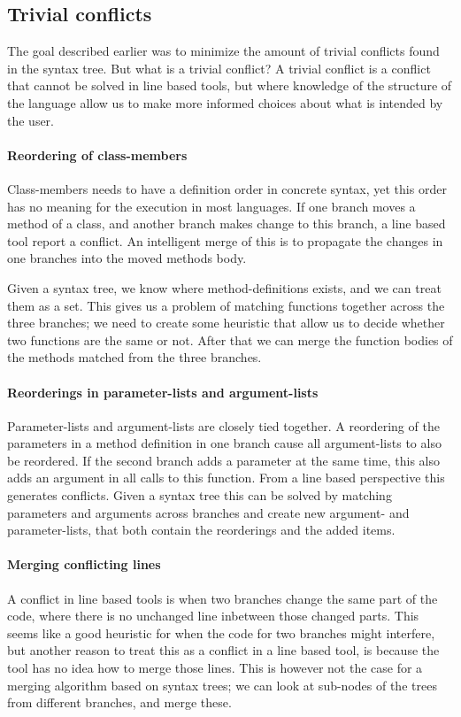 \documentclass[11pt]{article}
\begin{document}
\subsection{Trivial conflicts}
\label{TrivialConflict}
The goal described earlier was to minimize the amount of trivial conflicts found in the syntax tree. But what is a trivial conflict? A trivial conflict is a conflict that cannot be solved in line based tools, but where knowledge of the structure of the language allow us to make more informed choices about what is intended by the user.

\paragraph{Reordering of class-members} Class-members needs to have a definition order in concrete syntax, yet this order has no meaning for the execution in most languages. If one branch moves a method of a class, and another branch makes change to this branch, a line based tool report a conflict. An intelligent merge of this is to propagate the changes in one branches into the moved methods body.

Given a syntax tree, we know where method-definitions exists, and we can treat them as a set. This gives us a problem of matching functions together across the three branches; we need to create some heuristic that allow us to decide whether two functions are the same or not. After that we can merge the function bodies of the methods matched from the three branches.

\paragraph{Reorderings in parameter-lists and argument-lists} Parameter-lists and argument-lists are closely tied together. A reordering of the parameters in a method definition in one branch cause all argument-lists to also be reordered. If the second branch adds a parameter at the same time, this also adds an argument in all calls to this function. From a line based perspective this generates conflicts. Given a syntax tree this can be solved by matching parameters and arguments across branches and create new argument- and parameter-lists, that both contain the reorderings and the added items.

\paragraph{Merging conflicting lines} A conflict in line based tools is when two branches change the same part of the code, where there is no unchanged line inbetween those changed parts. This seems like a good heuristic for when the code for two branches might interfere, but another reason to treat this as a conflict in a line based tool, is because the tool has no idea how to merge those lines. This is however not the case for a merging algorithm based on syntax trees; we can look at sub-nodes of the trees from different branches, and merge these.
\end{document}
